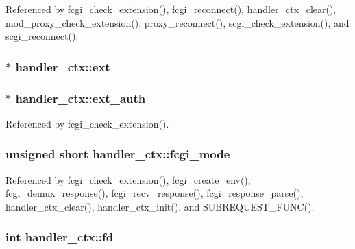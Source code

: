 Referenced by fcgi\-\_\-check\-\_\-extension(), fcgi\-\_\-reconnect(), handler\-\_\-ctx\-\_\-clear(), mod\-\_\-proxy\-\_\-check\-\_\-extension(), proxy\-\_\-reconnect(), scgi\-\_\-check\-\_\-extension(), and scgi\-\_\-reconnect().

\hypertarget{structhandler__ctx_a937879800a0203f31a86a445a8591bfe}{
\subsubsection[{ext}]{$\ast$ handler\-\_\-ctx\-::ext}}\label{structhandler__ctx_a937879800a0203f31a86a445a8591bfe}
\hypertarget{structhandler__ctx_a80ea6b7325cdbcf66d2a30035462ea69}{
\subsubsection[{ext\-\_\-auth}]{$\ast$ handler\-\_\-ctx\-::ext\-\_\-auth}}\label{structhandler__ctx_a80ea6b7325cdbcf66d2a30035462ea69}


Referenced by fcgi\-\_\-check\-\_\-extension().

\hypertarget{structhandler__ctx_a6583306740edd409237777ee334275d4}{
\subsubsection[{fcgi\-\_\-mode}]{\setlength{\rightskip}{0pt plus 5cm}unsigned short handler\-\_\-ctx\-::fcgi\-\_\-mode}}\label{structhandler__ctx_a6583306740edd409237777ee334275d4}


Referenced by fcgi\-\_\-check\-\_\-extension(), fcgi\-\_\-create\-\_\-env(), fcgi\-\_\-demux\-\_\-response(), fcgi\-\_\-recv\-\_\-response(), fcgi\-\_\-response\-\_\-parse(), handler\-\_\-ctx\-\_\-clear(), handler\-\_\-ctx\-\_\-init(), and S\-U\-B\-R\-E\-Q\-U\-E\-S\-T\-\_\-\-F\-U\-N\-C().

\hypertarget{structhandler__ctx_aabb04ed64f0b8ca7a1300025ff452fbf}{
\subsubsection[{fd}]{\setlength{\rightskip}{0pt plus 5cm}int handler\-\_\-ctx\-::fd}}\label{structhandler__ctx_aabb04ed64f0b8ca7a1300025ff452fbf}


